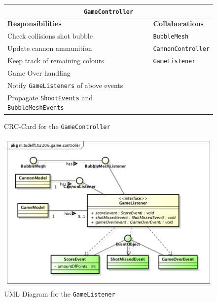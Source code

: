 \documentclass[a4paper]{article}
\begin{document}
\begin{figure}[H]
    \begin{center}
    \begin{tabular}{ | p{8cm} | p{4cm} | }
      \multicolumn{2}{c}{\texttt{GameController}} \\ \hline
      \textbf{Responsibilities} & \textbf{Collaborations} \\ \hline
      Check collisions shot bubble & \texttt{BubbleMesh} \\
      Update cannon ammunition & \texttt{CannonController} \\
      Keep track of remaining colours & \texttt{GameListener} \\
      Game Over handling & \\
      Notify \texttt{GameListeners} of above events & \\
      Propagate \texttt{ShootEvents} and \texttt{BubbleMeshEvents} & \\
      \hline
    \end{tabular}
    \end{center}
    \caption{CRC-Card for the \texttt{GameController}}
\end{figure}

\begin{figure}[H]
    \centering
    \includegraphics[scale=0.5]{GameListener.png}
    \caption{UML Diagram for the \texttt{GameListener}}
\end{figure}

\end{document}
